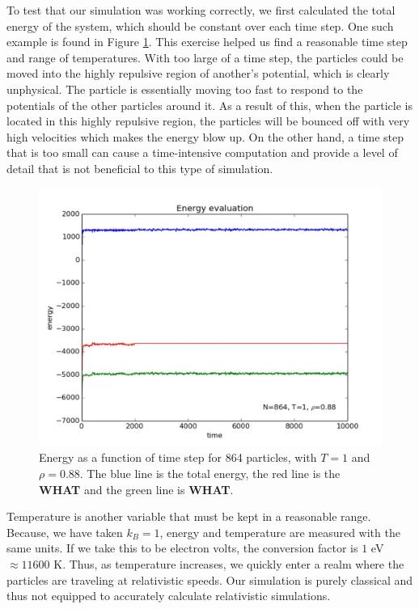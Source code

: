 \documentclass{article}
\begin{document}
\begin{multicols}{2}
To test that our simulation was working correctly, we first calculated the total energy of the system, which should be constant over each time step.  One such example is found in Figure \ref{engcons}.  This exercise helped us find a reasonable time step and range of temperatures.  With too large of a time step, the particles could be moved into the highly repulsive region of another's potential, which is clearly unphysical. The particle is essentially moving too fast to respond to the potentials of the other particles around it. As a result of this, when the particle is located in this highly repulsive region, the particles will be bounced off with very high velocities which makes the energy blow up. On the other hand, a time step that is too small can cause a time-intensive computation and provide a level of detail that is not beneficial to this type of simulation.  \\

\begin{figure}[H]
\begin{center}
\includegraphics[width=\linewidth]{plots/energyT1rho088N864lpnum1000.pdf}
\caption{Energy as a function of time step for 864 particles, with $T=1$ and $\rho = 0.88$.  The blue line is the total energy, the red line is the \textbf{WHAT} and the green line is \textbf{WHAT}.}
\label{engcons}
\end{center}
\end{figure}

Temperature is another variable that must be kept in a reasonable range.  Because, we have taken $k_B =1$, energy and temperature are measured with the same units.  If we take this to be electron volts, the conversion factor is $1 $ eV $\approx 11600$ K.  Thus, as temperature increases, we quickly enter a realm where the particles are traveling at relativistic speeds.  Our simulation is purely classical and thus not equipped to accurately calculate relativistic simulations.


\end{multicols}
\end{document}
